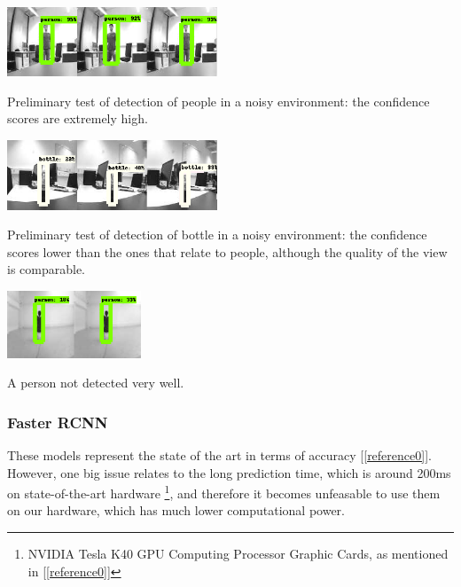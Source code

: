 \documentclass[10pt,conference,compsocconf]{IEEEtran}
\begin{document}
\begin{center}
	\captionsetup{type=figure}
	\includegraphics[width=0.47\textwidth]{img/person_detection.png}
	\caption {Preliminary test of detection of people in a noisy environment: the confidence scores are extremely high.}
	\label{fig:person_detection}
\end{center}
\begin{center}
	\captionsetup{type=figure}
	\includegraphics[width=0.47\textwidth]{img/bottle_detection.png}
	\caption {Preliminary test of detection of bottle in a noisy environment: the confidence scores lower than the ones that relate to people, although the quality of the view is comparable.}
	\label{fig:bottle_detection}
\end{center}
\begin{center}
	\captionsetup{type=figure}
	\includegraphics[width=0.30\textwidth]{img/person_bad_position.png}
	\caption {A person not detected very well.}
	\label{fig:person_bad_position}
\end{center}
\subsubsection{Faster RCNN}
These models represent the state of the art in terms of accuracy [\ref{reference0}]. However, one big issue relates to the long prediction time, which is around 200ms on state-of-the-art hardware \footnote{NVIDIA Tesla K40 GPU Computing Processor Graphic Cards, as mentioned in [\ref{reference0}]}, and therefore it becomes unfeasable to use them on our hardware, which has much lower computational power.
\end{document}
